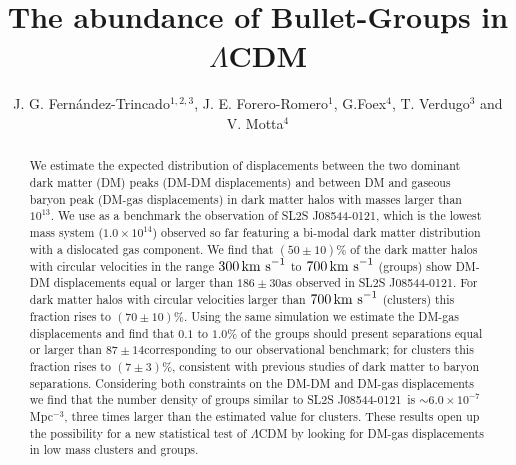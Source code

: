\documentclass{emulateapj}
\newcommand{\hkpc}{{\ifmmode{h^{-1}{\rm kpc}}\else{$h^{-1}$kpc }\fi}}
\newcommand{\hMsun}{{\ifmmode{h^{-1}{\rm {M_{\odot}}}}\else{$h^{-1}{\rm{M_{\odot}}}$}\fi}}
\newcommand{\kms}{{\ifmmode{{\mathrm{\,km\ s}^{-1}}}\else{\,km~s$^{-1}$}\fi}}
\newcommand{\bullg}{SL2S J08544-0121}
\begin{document}
 

\title{The abundance of Bullet-Groups in $\Lambda$CDM}
\author{J. G. Fern\'andez-Trincado$^{1,2,3}$, J. E. Forero-Romero$^1$,
  G.Foex$^4$, T. Verdugo$^3$ and V. Motta$^4$} 
\begin{abstract}

We estimate the expected distribution of displacements between the two
dominant dark matter (DM) peaks (DM-DM displacements) and between
DM and gaseous baryon peak (DM-gas displacements) in dark matter halos 
with masses larger than $10^{13}$\hMsun. We use as a benchmark the
observation of \bullg, which is the lowest mass system ($1.0\times
10^{14}$\hMsun) observed so far
featuring a bi-modal dark matter distribution with a dislocated
gas component. We find that $(50 \pm 10)\%$ of the dark matter
halos with circular velocities in the range $300\kms$ to $700\kms$
(groups) show DM-DM displacements equal or larger than $186 \pm
30$\hkpc as observed in \bullg. For dark matter halos with circular
velocities larger than $700\kms$ (clusters) this fraction rises to
$(70 \pm 10)\%$. Using the same simulation we estimate the DM-gas
displacements and find that $0.1$ to $1.0\%$ of the groups should
present separations equal or larger than $87\pm 14$\hkpc corresponding
to our observational benchmark; for clusters this fraction rises to
$(7\pm 3)\%$, consistent with previous studies of dark matter to
baryon separations. Considering both constraints on the DM-DM and
DM-gas displacements we find that the number density of groups
similar to \bullg\ is $\sim 6.0\times 10^{-7}$ Mpc$^{-3}$, three times
larger than the estimated value for clusters. These results open up
the possibility for a new statistical test of $\Lambda$CDM by looking
for DM-gas displacements in low mass clusters and groups. 
\end{abstract}
\end{document}
